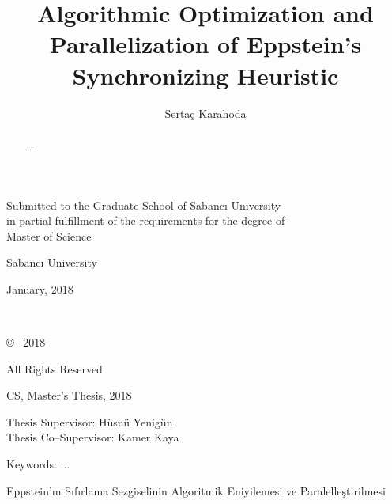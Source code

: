 \documentclass[12pt]{article}
\title{Algorithmic Optimization and Parallelization of Eppstein's Synchronizing Heuristic}
\author{Serta\c{c} Karahoda}
\date{}
\begin{document}
\maketitle
\thispagestyle{empty}
\vspace{1cm}

\begin{center}
Submitted to the Graduate School of Sabanc{\i} University \\
in partial fulfillment of the requirements for the degree of \\
Master of Science
\end{center}

\vspace{2cm}

\begin{center}
Sabanc{\i} University
\end{center}

\begin{center}
January, 2018
\end{center}


\clearpage
$ $
\thispagestyle{empty}
\clearpage
$ $
\vspace{5cm}
\begin{center}
\copyright \hspace{0.1cm} \MyAuthor\ 2018

All Rights Reserved
\thispagestyle{empty}
\end{center}
\clearpage

\begin{center}
\large
\MyTitle
\end{center}

\begin{center}
\MyAuthor

CS, Master's Thesis, 2018

Thesis Supervisor: H\"{u}sn\"{u} Yenig\"{u}n\\
Thesis Co--Supervisor: Kamer Kaya
\end{center}

\begin{center}
Keywords: ...
\end{center}

\begin{abstract}
...
\end{abstract}
\clearpage

\begin{center}
\large
Eppstein'{\i}n S{\i}f{\i}rlama Sezgiselinin Algoritmik Eniyilemesi ve Paralelle\c{s}tirilmesi
\end{center}
\end{document}
